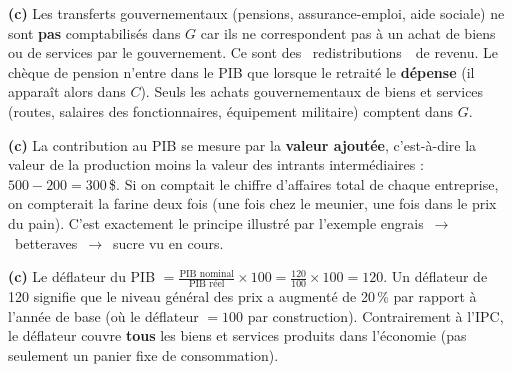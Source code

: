 
\begin{reponse}
\textbf{(c)} Les transferts gouvernementaux (pensions, assurance-emploi, aide sociale) ne sont \textbf{pas} comptabilisés dans $G$ car ils ne correspondent pas à un achat de biens ou de services par le gouvernement. Ce sont des \guillemotleft~redistributions~\guillemotright\ de revenu. Le chèque de pension n'entre dans le PIB que lorsque le retraité le \textbf{dépense} (il apparaît alors dans $C$). Seuls les achats gouvernementaux de biens et services (routes, salaires des fonctionnaires, équipement militaire) comptent dans $G$.
\end{reponse}


\begin{reponse}
\textbf{(c)} La contribution au PIB se mesure par la \textbf{valeur ajoutée}, c'est-à-dire la valeur de la production moins la valeur des intrants intermédiaires : $500 - 200 = 300$\,\$. Si on comptait le chiffre d'affaires total de chaque entreprise, on compterait la farine deux fois (une fois chez le meunier, une fois dans le prix du pain). C'est exactement le principe illustré par l'exemple engrais~$\to$~betteraves~$\to$~sucre vu en cours.
\end{reponse}


\begin{reponse}
\textbf{(c)} Le déflateur du PIB $= \frac{\text{PIB nominal}}{\text{PIB réel}} \times 100 = \frac{120}{100} \times 100 = 120$. Un déflateur de 120 signifie que le niveau général des prix a augmenté de 20\,\% par rapport à l'année de base (où le déflateur $= 100$ par construction). Contrairement à l'IPC, le déflateur couvre \textbf{tous} les biens et services produits dans l'économie (pas seulement un panier fixe de consommation).
\end{reponse}

